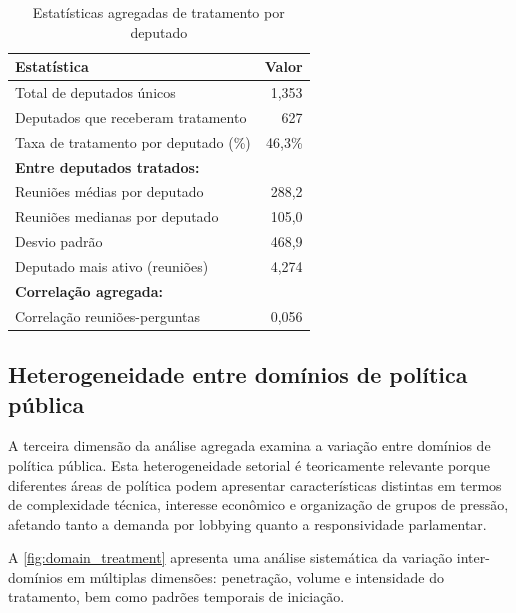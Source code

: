 \begin{table}[htbp]
\centering
\caption{Estatísticas agregadas de tratamento por deputado}
\label{tab:mep_treatment_stats}
\begin{tabular}{lr}
\toprule
\textbf{Estatística} & \textbf{Valor} \\
\midrule
Total de deputados únicos & 1{,}353 \\
Deputados que receberam tratamento & 627 \\
Taxa de tratamento por deputado (\%) & 46{,}3\% \\
\midrule
\textbf{Entre deputados tratados:} & \\
Reuniões médias por deputado & 288{,}2 \\
Reuniões medianas por deputado & 105{,}0 \\
Desvio padrão & 468{,}9 \\
Deputado mais ativo (reuniões) & 4{,}274 \\
\midrule
\textbf{Correlação agregada:} & \\
Correlação reuniões-perguntas & 0{,}056 \\
\bottomrule
\end{tabular}
\end{table}

\subsection{Heterogeneidade entre domínios de política pública}

A terceira dimensão da análise agregada examina a variação entre domínios de política pública. Esta heterogeneidade setorial é teoricamente relevante porque diferentes áreas de política podem apresentar características distintas em termos de complexidade técnica, interesse econômico e organização de grupos de pressão, afetando tanto a demanda por lobbying quanto a responsividade parlamentar.


A \autoref{fig:domain_treatment} apresenta uma análise sistemática da variação inter-domínios em múltiplas dimensões: penetração, volume e intensidade do tratamento, bem como padrões temporais de iniciação.


